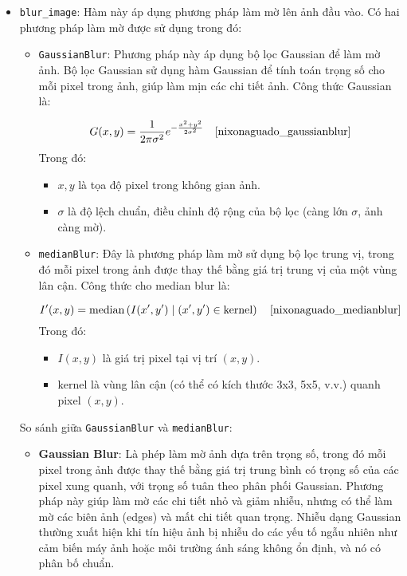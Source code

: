 \documentclass[a4paper,12pt]{article}
\begin{document}
\begin{itemize}
    \item \texttt{blur\_image}: Hàm này áp dụng phương pháp làm mờ lên ảnh đầu vào. Có hai phương pháp làm mờ được sử dụng trong đó:
    
    \begin{itemize}
        \item \texttt{GaussianBlur}: Phương pháp này áp dụng bộ lọc Gaussian để làm mờ ảnh. Bộ lọc Gaussian sử dụng hàm Gaussian để tính toán trọng số cho mỗi pixel trong ảnh, giúp làm mịn các chi tiết ảnh. Công thức Gaussian là:
        
        \[
        G(x, y) = \frac{1}{2\pi\sigma^2} e^{-\frac{x^2 + y^2}{2\sigma^2}}
        \quad \text{\cite{nixonaguado_gaussianblur}}
        \]
        Trong đó:
        \begin{itemize}
            \item \(x, y\) là tọa độ pixel trong không gian ảnh.
            \item \(\sigma\) là độ lệch chuẩn, điều chỉnh độ rộng của bộ lọc (càng lớn \(\sigma\), ảnh càng mờ).
        \end{itemize}
        
        \item \texttt{medianBlur}: Đây là phương pháp làm mờ sử dụng bộ lọc trung vị, trong đó mỗi pixel trong ảnh được thay thế bằng giá trị trung vị của một vùng lân cận. Công thức cho median blur là:
        
        \[
        I'(x, y) = \text{median}\left(I(x', y') \mid (x', y') \in \text{kernel}\right)
        \quad \text{\cite{nixonaguado_medianblur}}
        \]
        Trong đó:
        \begin{itemize}
            \item \(I(x, y)\) là giá trị pixel tại vị trí \((x, y)\).
            \item \(\text{kernel}\) là vùng lân cận (có thể có kích thước 3x3, 5x5, v.v.) quanh pixel \((x, y)\).
        \end{itemize}
    \end{itemize}
    
    \noindent So sánh giữa \texttt{GaussianBlur} và \texttt{medianBlur}:
    \begin{itemize}
        \item \textbf{Gaussian Blur}: Là phép làm mờ ảnh dựa trên trọng số, trong đó mỗi pixel trong ảnh được thay thế bằng giá trị trung bình có trọng số của các pixel xung quanh, với trọng số tuân theo phân phối Gaussian. Phương pháp này giúp làm mờ các chi tiết nhỏ và giảm nhiễu, nhưng có thể làm mờ các biên ảnh (edges) và mất chi tiết quan trọng. Nhiễu dạng Gaussian thường xuất hiện khi tín hiệu ảnh bị nhiễu do các yếu tố ngẫu nhiên như cảm biến máy ảnh hoặc môi trường ánh sáng không ổn định, và nó có phân bố chuẩn.
        

\end{itemize}
\end{itemize}
\end{document}
